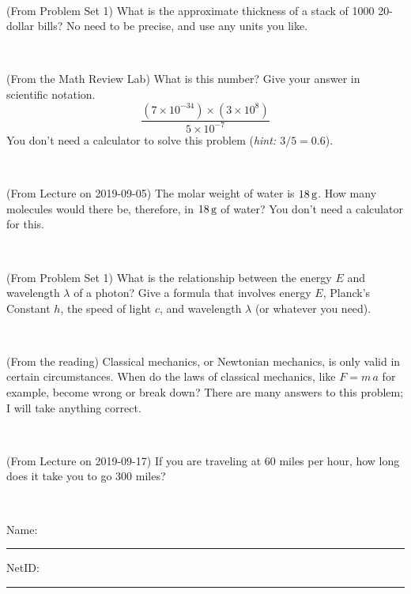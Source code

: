 \documentclass[12pt, letterpaper]{article}
\begin{document}
\vfill ~

\begin{problem} (From Problem Set 1)
What is the approximate thickness of a stack of 1000 20-dollar bills?
No need to be precise, and use any units you like.
\end{problem}


\vfill ~

\begin{problem} (From the Math Review Lab)
What is this number? Give your answer in scientific notation.
$$
\frac{(7\times10^{-34})\times(3\times10^8)}{5\times10^{-7}}
$$
You don't need a calculator to solve this problem (\textit{hint: $3/5=0.6$}).
\end{problem}


\vfill ~


\clearpage


\begin{problem} (From Lecture on 2019-09-05)
The molar weight of water is $18\,\mathrm{g}$. How many molecules would there
be, therefore, in $18\,\mathrm{g}$ of water? You don't need a calculator for
this.
\end{problem}


\vfill ~

\begin{problem} (From Problem Set 1)
What is the relationship between the energy $E$ and wavelength
$\lambda$ of a photon? Give a formula that involves energy $E$,
Planck's Constant $h$, the speed of light $c$, and wavelength
$\lambda$ (or whatever you need).
\end{problem}

\vfill ~

\begin{problem} (From the reading)
Classical mechanics, or Newtonian mechanics, is only valid in certain
circumstances. When do the laws of classical mechanics, like $F =
m\,a$ for example, become wrong or break down? There are many answers
to this problem; I will take anything correct.
\end{problem}


\vfill ~

\begin{problem} (From Lecture on 2019-09-17)
If you are traveling at 60 miles per hour, how long does
it take you to go 300 miles?
\end{problem}


\vfill ~


\cleardoublepage



\noindent
Name: \rule[-1ex]{0.60\textwidth}{0.1pt}
NetID: \rule[-1ex]{0.20\textwidth}{0.1pt}
\end{document}
